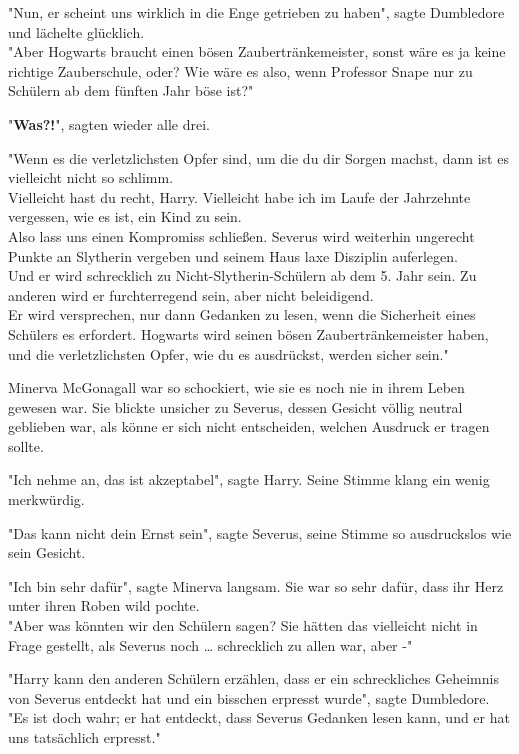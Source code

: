 {"Nun, er scheint uns wirklich in die Enge getrieben zu haben", sagte Dumbledore und lächelte glücklich.\\ "Aber Hogwarts braucht einen bösen Zaubertränkemeister, sonst wäre es ja keine richtige Zauberschule, oder? Wie wäre es also, wenn Professor Snape nur zu Schülern ab dem fünften Jahr böse ist?"

"\textbf{Was?!}", sagten wieder alle drei.

"Wenn es die verletzlichsten Opfer sind, um die du dir Sorgen machst, dann ist es vielleicht nicht so schlimm.\\ Vielleicht hast du recht, Harry. Vielleicht habe ich im Laufe der Jahrzehnte vergessen, wie es ist, ein Kind zu sein.\\ Also lass uns einen Kompromiss schließen. Severus wird weiterhin ungerecht Punkte an Slytherin vergeben und seinem Haus laxe Disziplin auferlegen.\\ Und er wird schrecklich zu Nicht-Slytherin-Schülern ab dem 5. Jahr sein. Zu anderen wird er furchterregend sein, aber nicht beleidigend.\\ Er wird versprechen, nur dann Gedanken zu lesen, wenn die Sicherheit eines Schülers es erfordert. Hogwarts wird seinen bösen Zaubertränkemeister haben, und die verletzlichsten Opfer, wie du es ausdrückst, werden sicher sein."

Minerva McGonagall war so schockiert, wie sie es noch nie in ihrem Leben gewesen war. Sie blickte unsicher zu Severus, dessen Gesicht völlig neutral geblieben war, als könne er sich nicht entscheiden, welchen Ausdruck er tragen sollte.

"Ich nehme an, das ist akzeptabel", sagte Harry. Seine Stimme klang ein wenig merkwürdig.

"Das kann nicht dein Ernst sein", sagte Severus, seine Stimme so ausdruckslos wie sein Gesicht.

"Ich bin sehr dafür", sagte Minerva langsam. Sie war so sehr dafür, dass ihr Herz unter ihren Roben wild pochte.\\ "Aber was könnten wir den Schülern sagen? Sie hätten das vielleicht nicht in Frage gestellt, als Severus noch … schrecklich zu allen war, aber -"

"Harry kann den anderen Schülern erzählen, dass er ein schreckliches Geheimnis von Severus entdeckt hat und ein bisschen erpresst wurde", sagte Dumbledore.\\ "Es ist doch wahr; er hat entdeckt, dass Severus Gedanken lesen kann, und er hat uns tatsächlich erpresst."

}
